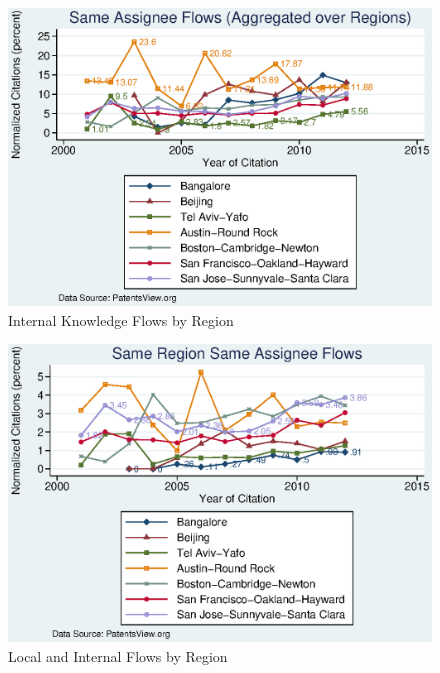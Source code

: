 \documentclass[12pt]{article}
\begin{document}
\begin{figure}[h]
\begin{centering}
  \includegraphics[width=\textwidth]{SameAssigneeFlows}
  \caption{Internal Knowledge Flows by Region}
  \label{fig:SameAssigneeFlows}
\end{centering}
\end{figure}


\begin{figure}[h]
\begin{centering}
  \includegraphics[width=\textwidth]{SameRegionSameAssigneeFlows}
  \caption{Local and Internal Flows by Region}
  \label{fig:SameRegionSameAssigneeFlows}
\end{centering}
\end{figure}
\end{document}
